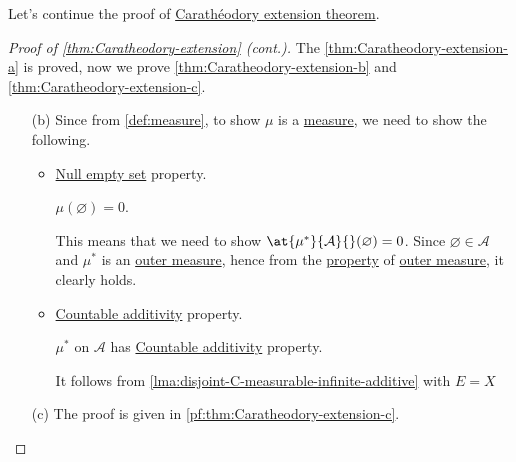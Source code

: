 Let's continue the proof of \hyperref[thm:Caratheodory-extension]{Carathéodory extension theorem}.
\begin{proof}[Proof of \autoref{thm:Caratheodory-extension} (cont.)]\label{pf:thm:Caratheodory-extension-cont}
	The \autoref{thm:Caratheodory-extension-a} is proved, now we prove \autoref{thm:Caratheodory-extension-b} and \autoref{thm:Caratheodory-extension-c}.
	\begin{enumerate}
		\item[(b)] Since from \autoref{def:measure}, to show \(\mu \) is a \hyperref[def:measure]{measure}, we need to show the following.
		      \begin{itemize}
			      \item \hyperref[def:measure-null-empty-set]{Null empty set} property.
			            \begin{claim}
				            \(\mu (\varnothing ) = 0\).
			            \end{claim}
			            \begin{explanation}
				            This means that we need to show \(\at{\mu^{\ast} }{\mathcal{A}}{}(\varnothing ) = 0\). Since \(\varnothing \in \mathcal{A} \) and \(\mu^{\ast}\) is an \hyperref[def:outer-measure]{outer measure}, hence from the \hyperref[def:outer-measure-null-empty-set]{property} of \hyperref[def:outer-measure]{outer measure}, it clearly holds.
			            \end{explanation}
			      \item \hyperref[def:measure-countable-additivity]{Countable additivity} property.
			            \begin{claim}
				            \(\mu ^{\ast} \) on \(\mathcal{A} \) has \hyperref[def:measure-countable-additivity]{Countable additivity} property.
			            \end{claim}
			            \begin{explanation}
				            It follows from \autoref{lma:disjoint-C-measurable-infinite-additive} with \(E = X\)
			            \end{explanation}
		      \end{itemize}
		\item[(c)] The proof is given in \autoref{pf:thm:Caratheodory-extension-c}.
	\end{enumerate}
\end{proof}

